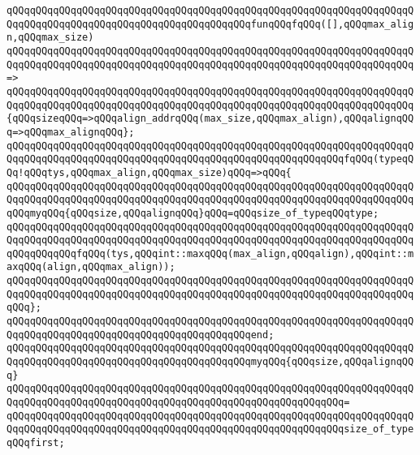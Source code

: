 \verb|qQQqqQQqqQQqqQQqqQQqqQQqqQQqqQQqqQQqqQQqqQQqqQQqqQQqqQQqqQQqqQQqqQQqqQQqqQQqqQQqqQQqqQQqqQQqqQQqqQQqqQQqqQQqqQQqfunqQQqfqQQq([],qQQqmax_align,qQQqmax_size)|\newline
\verb|qQQqqQQqqQQqqQQqqQQqqQQqqQQqqQQqqQQqqQQqqQQqqQQqqQQqqQQqqQQqqQQqqQQqqQQqqQQqqQQqqQQqqQQqqQQqqQQqqQQqqQQqqQQqqQQqqQQqqQQqqQQqqQQqqQQqqQQqqQQq=>|\newline
\verb|qQQqqQQqqQQqqQQqqQQqqQQqqQQqqQQqqQQqqQQqqQQqqQQqqQQqqQQqqQQqqQQqqQQqqQQqqQQqqQQqqQQqqQQqqQQqqQQqqQQqqQQqqQQqqQQqqQQqqQQqqQQqqQQqqQQqqQQqqQQq{qQQqsizeqQQq=>qQQqalign_addrqQQq(max_size,qQQqmax_align),qQQqalignqQQq=>qQQqmax_alignqQQq};|\newline
\newline
\verb|qQQqqQQqqQQqqQQqqQQqqQQqqQQqqQQqqQQqqQQqqQQqqQQqqQQqqQQqqQQqqQQqqQQqqQQqqQQqqQQqqQQqqQQqqQQqqQQqqQQqqQQqqQQqqQQqqQQqqQQqqQQqqQQqfqQQq(typeqQQq!qQQqtys,qQQqmax_align,qQQqmax_size)qQQq=>qQQq{|\newline
\verb|qQQqqQQqqQQqqQQqqQQqqQQqqQQqqQQqqQQqqQQqqQQqqQQqqQQqqQQqqQQqqQQqqQQqqQQqqQQqqQQqqQQqqQQqqQQqqQQqqQQqqQQqqQQqqQQqqQQqqQQqqQQqqQQqqQQqqQQqqQQqqQQqmyqQQq{qQQqsize,qQQqalignqQQq}qQQq=qQQqsize_of_typeqQQqtype;|\newline
\newline
\verb|qQQqqQQqqQQqqQQqqQQqqQQqqQQqqQQqqQQqqQQqqQQqqQQqqQQqqQQqqQQqqQQqqQQqqQQqqQQqqQQqqQQqqQQqqQQqqQQqqQQqqQQqqQQqqQQqqQQqqQQqqQQqqQQqqQQqqQQqqQQqqQQqqQQqqQQqfqQQq(tys,qQQqint::maxqQQq(max_align,qQQqalign),qQQqint::maxqQQq(align,qQQqmax_align));|\newline
\verb|qQQqqQQqqQQqqQQqqQQqqQQqqQQqqQQqqQQqqQQqqQQqqQQqqQQqqQQqqQQqqQQqqQQqqQQqqQQqqQQqqQQqqQQqqQQqqQQqqQQqqQQqqQQqqQQqqQQqqQQqqQQqqQQqqQQqqQQqqQQqqQQq};|\newline
\verb|qQQqqQQqqQQqqQQqqQQqqQQqqQQqqQQqqQQqqQQqqQQqqQQqqQQqqQQqqQQqqQQqqQQqqQQqqQQqqQQqqQQqqQQqqQQqqQQqqQQqqQQqqQQqqQQqend;|\newline
\newline
\verb|qQQqqQQqqQQqqQQqqQQqqQQqqQQqqQQqqQQqqQQqqQQqqQQqqQQqqQQqqQQqqQQqqQQqqQQqqQQqqQQqqQQqqQQqqQQqqQQqqQQqqQQqqQQqqQQqmyqQQq{qQQqsize,qQQqalignqQQq}|\newline
\verb|qQQqqQQqqQQqqQQqqQQqqQQqqQQqqQQqqQQqqQQqqQQqqQQqqQQqqQQqqQQqqQQqqQQqqQQqqQQqqQQqqQQqqQQqqQQqqQQqqQQqqQQqqQQqqQQqqQQqqQQqqQQqqQQq=|\newline
\verb|qQQqqQQqqQQqqQQqqQQqqQQqqQQqqQQqqQQqqQQqqQQqqQQqqQQqqQQqqQQqqQQqqQQqqQQqqQQqqQQqqQQqqQQqqQQqqQQqqQQqqQQqqQQqqQQqqQQqqQQqqQQqqQQqsize_of_typeqQQqfirst;|\newline
